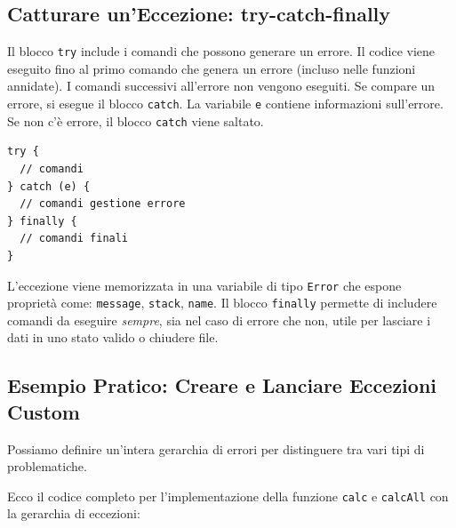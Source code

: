 \documentclass[12pt,a4paper]{article}
\begin{document}
\subsection{Catturare un'Eccezione: try-catch-finally}
Il blocco \texttt{try} include i comandi che possono generare un errore. Il codice viene eseguito fino al primo comando che genera un errore (incluso nelle funzioni annidate). I comandi successivi all'errore non vengono eseguiti. Se compare un errore, si esegue il blocco \texttt{catch}. La variabile \texttt{e} contiene informazioni sull'errore. Se non c'è errore, il blocco \texttt{catch} viene saltato.

\begin{lstlisting}
try {
  // comandi
} catch (e) {
  // comandi gestione errore
} finally {
  // comandi finali
}
\end{lstlisting}

L'eccezione viene memorizzata in una variabile di tipo \texttt{Error} che espone proprietà come: \texttt{message}, \texttt{stack}, \texttt{name}. 
Il blocco \texttt{finally} permette di includere comandi da eseguire \textit{sempre}, sia nel caso di errore che non, utile per lasciare i dati in uno stato valido o chiudere file.

\subsection{Esempio Pratico: Creare e Lanciare Eccezioni Custom}
Possiamo definire un'intera gerarchia di errori per distinguere tra vari tipi di problematiche.

\begin{center}
\end{center}

Ecco il codice completo per l'implementazione della funzione \texttt{calc} e \texttt{calcAll} con la gerarchia di eccezioni:
\end{document}
